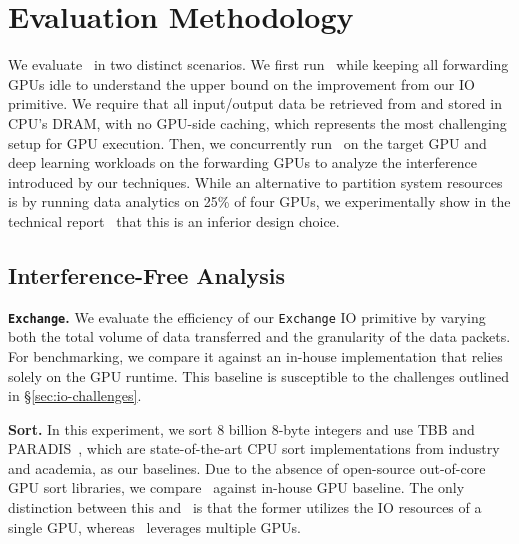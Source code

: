 \section{Evaluation Methodology} \label{section:methodology}

We evaluate \THISWORK\ in two distinct scenarios.
We first run \THISWORK\ while keeping all forwarding GPUs idle to understand the upper bound on the improvement from our IO primitive.
We require that all input/output data be retrieved from and stored in CPU's DRAM, with no GPU-side caching, which represents the most challenging setup for GPU execution. 
Then, we concurrently run \THISWORK\ on the target GPU and deep learning workloads on the forwarding GPUs to analyze the interference introduced by our techniques.
While an alternative to partition system resources is by running data analytics on 25\% of four GPUs, we experimentally show in the technical report~\cite{vortex-technical-report} that this is an inferior design choice.


\begin{comment}
We conduct two sets of evaluations for \THISWORK. 
We first run \THISWORK\ while keeping all forwarding GPUs idle to understand the limit of our IO redistribution techniques.
We take the most challenging experiment setup for GPU execution, where \textit{all experiments require the input and output to be stored at and generated to CPU-side DRAM, and no caching is allowed}.
Then, we concurrently run \THISWORK\ on the target GPU and deep learning workloads on the forwarding GPUs to analyze the interference introduced by our techniques.
\end{comment}

\subsection{Interference-Free Analysis}
\noindent
\textbf{\texttt{Exchange}.}
We evaluate the efficiency of our \texttt{Exchange} IO primitive by varying both the total volume of data transferred and the granularity of the data packets. 
For benchmarking, we compare it against an in-house implementation that relies solely on the GPU runtime.
This baseline is susceptible to the challenges outlined in \S\ref{sec:io-challenges}.

\noindent
\textbf{Sort.}
In this experiment, we sort 8 billion 8-byte integers and use TBB and PARADIS~\cite{paradis-vldb-2015}, which are state-of-the-art CPU sort implementations from industry and academia, as our baselines. 
Due to the absence of open-source out-of-core GPU sort libraries, we compare \THISWORK\ against in-house GPU baseline. 
The only distinction between this and \THISWORK\ is that the former utilizes the IO resources of a single GPU, whereas \THISWORK\ leverages multiple GPUs.

